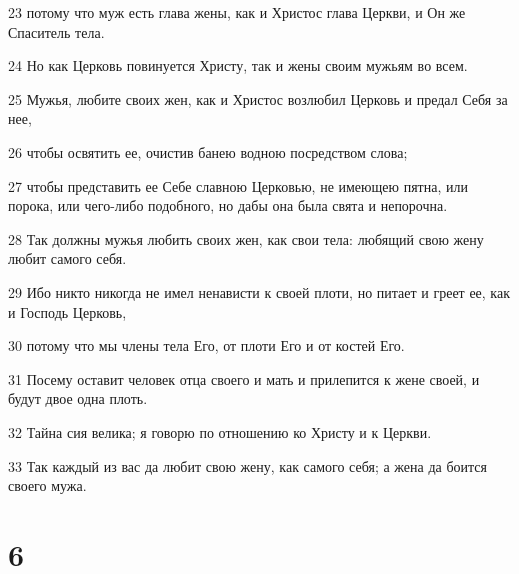 \par 23 потому что муж есть глава жены, как и Христос глава Церкви, и Он же Спаситель тела.
\par 24 Но как Церковь повинуется Христу, так и жены своим мужьям во всем.
\par 25 Мужья, любите своих жен, как и Христос возлюбил Церковь и предал Себя за нее,
\par 26 чтобы освятить ее, очистив банею водною посредством слова;
\par 27 чтобы представить ее Себе славною Церковью, не имеющею пятна, или порока, или чего-либо подобного, но дабы она была свята и непорочна.
\par 28 Так должны мужья любить своих жен, как свои тела: любящий свою жену любит самого себя.
\par 29 Ибо никто никогда не имел ненависти к своей плоти, но питает и греет ее, как и Господь Церковь,
\par 30 потому что мы члены тела Его, от плоти Его и от костей Его.
\par 31 Посему оставит человек отца своего и мать и прилепится к жене своей, и будут двое одна плоть.
\par 32 Тайна сия велика; я говорю по отношению ко Христу и к Церкви.
\par 33 Так каждый из вас да любит свою жену, как самого себя; а жена да боится своего мужа.

\chapter{6}

